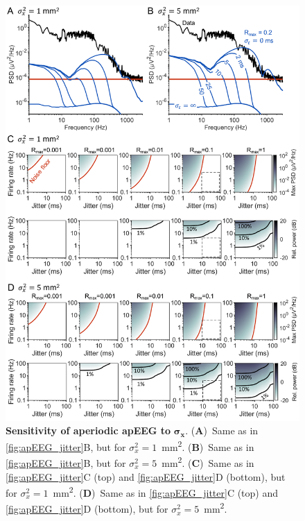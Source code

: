 \begin{figure}[h!]
    \centering
    \includegraphics[width=13.2cm]{Figures/chapter3/figureS5.png}
    \caption{\textbf{Sensitivity of aperiodic apEEG to }$\bm{\sigma_x}$. (\textbf{A})~Same as in {\autoref{fig:apEEG_jitter}B}, but for $\sigma^2_x=1$~\unit{\milli\meter^2}. (\textbf{B})~Same as in {\autoref{fig:apEEG_jitter}B}, but for $\sigma^2_x=5$~\unit{\milli\meter^2}. (\textbf{C})~Same as in {\autoref{fig:apEEG_jitter}C} (top) and {\autoref{fig:apEEG_jitter}D} (bottom), but for $\sigma^2_x=1$~\unit{\milli\meter^2}. (\textbf{D})~Same as in {\autoref{fig:apEEG_jitter}C} (top) and {\autoref{fig:apEEG_jitter}D} (bottom), but for $\sigma^2_x=5$~\unit{\milli\meter^2}.} 
    \label{fig:jitter_sigx}
\end{figure}

\clearpage

